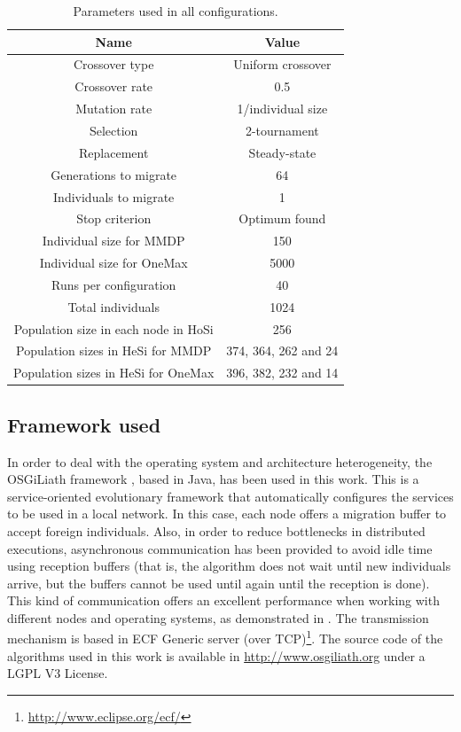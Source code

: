 \documentclass[final,1p,times]{elsarticle}
\begin{document}
\begin{table}
\centering
\caption{Parameters used in all configurations.}
\begin{tabular}{|c|c|} \hline
Name & Value\\ \hline

Crossover type & Uniform crossover \\ \hline
Crossover rate & 0.5\\ \hline
Mutation rate & 1/individual size\\ \hline
Selection & 2-tournament \\ \hline
Replacement & Steady-state\\ \hline
Generations to migrate & 64 \\ \hline
Individuals to migrate & 1 \\ \hline
Stop criterion & Optimum found \\ \hline
Individual size for MMDP & 150 \\ \hline
Individual size for OneMax & 5000 \\ \hline
Runs per configuration & 40 \\ \hline
\hline
Total individuals & 1024\\ \hline \hline
Population size in each node in HoSi & 256  \\ \hline
Population sizes in HeSi for MMDP & 374, 364, 262 and 24 \\ \hline
Population sizes in HeSi for OneMax & 396,  382, 232 and 14 \\ \hline
\hline\end{tabular}
\label{table:parameters}
\end{table}



\subsection{Framework used}
In order to deal with the operating system and architecture heterogeneity, the OSGiLiath framework \cite{SOASOCO}, based in Java, has been used in this work. This is a service-oriented evolutionary framework that automatically configures the services to be used in a local network. In this case, each node offers a migration buffer to accept foreign individuals. Also, in order to reduce bottlenecks in distributed executions, asynchronous communication has been provided to avoid idle time using reception buffers (that is, the algorithm does not wait until new individuals arrive, but the buffers cannot be used until again until the reception is done). This kind of communication offers an excellent performance when working with different nodes and operating systems, as demonstrated in \cite{HETEROGENEOUSHARD}. The transmission mechanism is based in ECF Generic server (over TCP)\footnote{\url{http://www.eclipse.org/ecf/}}.  The source code of the algorithms used in this work is available in \url{http://www.osgiliath.org} under a LGPL V3 License. 
\end{document}
